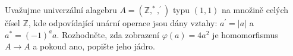 Uvažujme univerzální alagebru $A=\left ( \mathbb{Z},^{*},^{'} \right )$ typu
$(1,1)$ na množině celých čísel $\mathbb{Z}$, kde odpovídající unární operace
jsou dány vztahy: $a^{'}=\left | a \right |$ a $a^{*}=\left ( -1 \right )^{a}a$.
Rozhodněte, zda zobrazení $\varphi(a) = 4a^{2}$ je homomorfismus $A \rightarrow
A$ a pokoud ano, popište jeho jádro.
